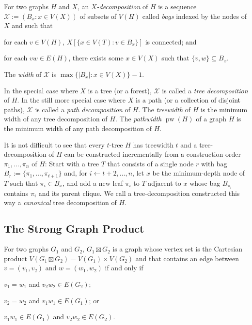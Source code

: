 \documentclass[kpfonts]{patmorin}
\DeclareMathOperator{\pw}{pw}
\theoremstyle{named}
\begin{document}
For two graphs $H$ and $X$, an \emph{$X$-decomposition} of $H$ is a sequence $\mathcal{X}:=(B_x:x\in V(X))$ of subsets of $V(H)$ called \emph{bags} indexed by the nodes of $X$ and such that
 \begin{inparaenum}[(i)]
     \item for each $v\in V(H)$, $X[\{x\in V(T):v\in B_x\}]$ is connected; and
     \item for each $vw\in E(H)$, there exists some $x\in V(X)$ such that $\{v,w\}\subseteq B_x$.
\end{inparaenum}
The \emph{width} of $\mathcal{X}$ is $\max\{|B_x|:x\in V(X)\}-1$.

In the special case where $X$ is a tree (or a forest), $\mathcal{X}$ is called a \emph{tree decomposition} of $H$.  In the still more special case where $X$ is a path (or a collection of disjoint paths), $\mathcal{X}$ is called a \emph{path decomposition} of $H$. The \emph{treewidth} of $H$ is the minimum width of any tree decomposition of $H$. The \emph{pathwidth} $\pw(H)$ of a graph $H$ is the minimum width of any path decomposition of $H$.

It is not difficult to see that every $t$-tree $H$ has treewidth $t$ and a tree-decomposition of $H$ can be constructed incrementally from a construction order $\pi_1,\ldots,\pi_n$ of $H$: Start with a tree $T$ that consists of a single node $r$ with bag $B_r:=\{\pi_1,\ldots,\pi_{t+1}\}$ and, for $i\gets t+2,\ldots,n$, let $x$ be the minimum-depth node of $T$ such that $\pi_i\in B_x$, and add a new leaf $\pi_i$ to $T$ adjacent to $x$ whose bag $B_{\pi_i}$ contains $\pi_i$ and its parent clique.  We call a tree-decomposition constructed this way a \emph{canonical} tree decomposition of $H$.

\subsection{The Strong Graph Product}

For two graphs $G_1$ and $G_2$, $G_1\boxtimes G_2$ is a graph whose vertex set is the Cartesian product $V(G_1\boxtimes G_2)= V(G_1)\times V(G_2)$ and that contains an edge between $v=(v_1,v_2)$ and $w=(w_1,w_2)$ if and only if
\begin{inparaenum}[(i)]
    \item $v_1=w_1$ and $v_2w_2\in E(G_2)$;
    \item $v_2=w_2$ and $v_1w_1\in E(G_1)$; or
    \item $v_1w_1\in E(G_1)$ and $v_2w_2\in E(G_2)$.
\end{inparaenum}
\end{document}
